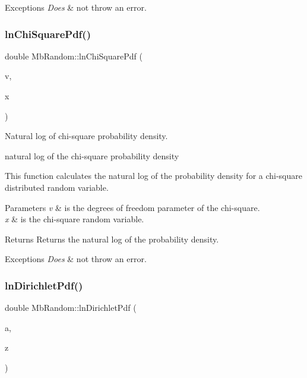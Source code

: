 \begin{DoxyExceptions}{Exceptions}
{\em Does} & not throw an error. \\
\hline
\end{DoxyExceptions}
\mbox{\label{class_mb_random_a814eac2d13019b2f99af06d50eb48499}} 
\subsubsection{\texorpdfstring{lnChiSquarePdf()}{lnChiSquarePdf()}}
{\footnotesize\ttfamily double Mb\+Random\+::ln\+Chi\+Square\+Pdf (\begin{DoxyParamCaption}\item[{double}]{v,  }\item[{double}]{x }\end{DoxyParamCaption})}



Natural log of chi-\/square probability density. 

natural log of the chi-\/square probability density

This function calculates the natural log of the probability density for a chi-\/square distributed random variable.


\begin{DoxyParams}{Parameters}
{\em v} & is the degrees of freedom parameter of the chi-\/square. \\
\hline
{\em x} & is the chi-\/square random variable. \\
\hline
\end{DoxyParams}
\begin{DoxyReturn}{Returns}
Returns the natural log of the probability density. 
\end{DoxyReturn}

\begin{DoxyExceptions}{Exceptions}
{\em Does} & not throw an error. \\
\hline
\end{DoxyExceptions}
\mbox{\label{class_mb_random_af4159ebe2cf7f73331f4087ce3ce1a15}} 
\subsubsection{\texorpdfstring{lnDirichletPdf()}{lnDirichletPdf()}}
{\footnotesize\ttfamily double Mb\+Random\+::ln\+Dirichlet\+Pdf (\begin{DoxyParamCaption}\item[{const \mbox{\hyperlink{class_mb_vector}{Mb\+Vector}}$<$ double $>$ \&}]{a,  }\item[{const \mbox{\hyperlink{class_mb_vector}{Mb\+Vector}}$<$ double $>$ \&}]{z }\end{DoxyParamCaption})}



